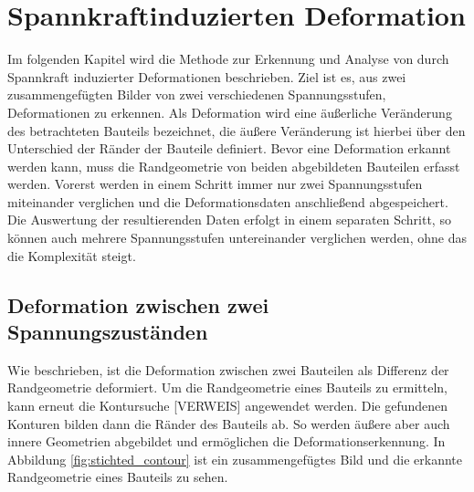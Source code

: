 
\chapter{Spannkraftinduzierten Deformation}

Im folgenden Kapitel wird die Methode zur Erkennung und Analyse von durch 
Spannkraft induzierter Deformationen beschrieben. Ziel ist es, 
aus zwei zusammengefügten Bilder von zwei verschiedenen Spannungsstufen, 
Deformationen zu erkennen.
Als Deformation wird eine äußerliche Veränderung des betrachteten Bauteils bezeichnet, 
die äußere Veränderung ist hierbei über den Unterschied der Ränder der Bauteile definiert.
Bevor eine Deformation erkannt werden kann, muss die Randgeometrie von beiden
abgebildeten Bauteilen erfasst werden.
Vorerst werden in einem Schritt immer nur zwei Spannungsstufen miteinander verglichen 
und die Deformationsdaten anschließend abgespeichert.
Die Auswertung der resultierenden Daten erfolgt in einem separaten Schritt, so können auch
mehrere Spannungsstufen untereinander verglichen werden, ohne das die Komplexität steigt.

\section{Deformation zwischen zwei Spannungszuständen}

Wie beschrieben, ist die Deformation zwischen zwei Bauteilen als Differenz der 
Randgeometrie deformiert. Um die Randgeometrie eines Bauteils zu ermitteln, 
kann erneut die Kontursuche [VERWEIS] angewendet werden. Die gefundenen Konturen bilden dann 
die Ränder des Bauteils ab. So werden äußere aber auch innere Geometrien 
abgebildet und ermöglichen die Deformationserkennung. 
In Abbildung \ref{fig:stichted_contour} ist ein 
zusammengefügtes Bild und die erkannte Randgeometrie eines Bauteils zu sehen.

